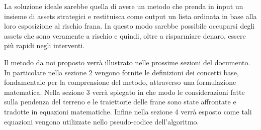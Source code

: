 La soluzione ideale sarebbe quella di avere un metodo che prenda in input un insieme di assets strategici e restituisca come output un lista ordinata in base alla loro esposizione al rischio frana. In questo modo sarebbe possibile occuparsi degli assets che sono veramente a rischio e quindi, oltre a risparmiare denaro, essere più rapidi negli interventi.

Il metodo da noi proposto verrà illustrato nelle prossime sezioni del documento. In particolare nella sezione 2 vengono fornite le definizioni dei concetti base, fondamentale per la comprensione del metodo, attraverso una formulazione matematica. Nella sezione 3 verrà spiegato in che modo le considerazioni fatte sulla pendenza del terreno e le traiettorie delle frane sono state affrontate e tradotte in equazioni matematiche. Infine nella sezione 4 verrà esposto come tali equazioni vengono utilizzate nello pseudo-codice dell'algoritmo.
